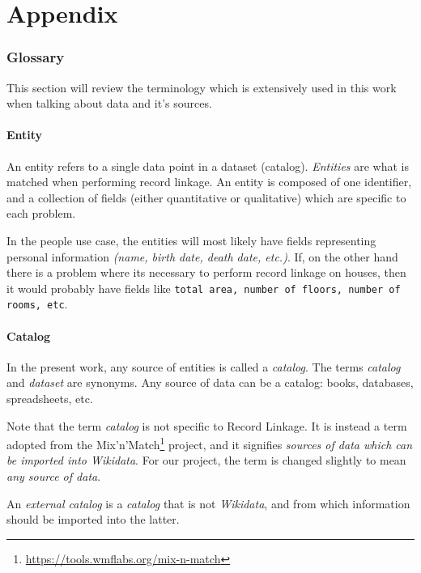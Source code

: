\documentclass[epsfig,a4paper,11pt,titlepage,twoside,openany]{book}
\newcommand{\footurl}[1]{\footnote{\url{#1}}}
\begin{document}
\chapter{Appendix}

\subsection{Glossary}
\label{sec:apx-glossary}

This section will review the terminology which is extensively used in this work when talking about data and it's sources.

\subsubsection{Entity}
\label{sec:rl-term-entity}

An entity refers to a single data point in a dataset (catalog). \textit{Entities} are what is matched when performing record linkage. An entity is composed of one identifier, and a collection of fields (either quantitative or qualitative) which are specific to each problem. 
  
In the people use case, the entities will most likely have fields representing personal information \textit{(name, birth date, death date, etc.)}. If, on the other hand there is a problem where its necessary to perform record linkage on houses, then it would probably have fields like \texttt{total area, number of floors, number of rooms, etc}.


\subsubsection{Catalog}
\label{sec:rl-term-catalog}

In the present work, any source of entities is called a \textit{catalog}. The terms \textit{catalog} and  \textit{dataset} are synonyms. Any source of data can be a catalog: books, databases, spreadsheets, etc. 

Note that the term \textit{catalog} is not specific to Record Linkage. It is instead a term adopted from the Mix'n'Match\footurl{https://tools.wmflabs.org/mix-n-match} project, and it signifies \textit{sources of data which can be imported into Wikidata}. For our project, the term is changed slightly to mean \textit{any source of data}. 

An \textit{external catalog} is a \textit{catalog} that is not \textit{Wikidata}, and from which information should be imported into the latter.
\end{document}
